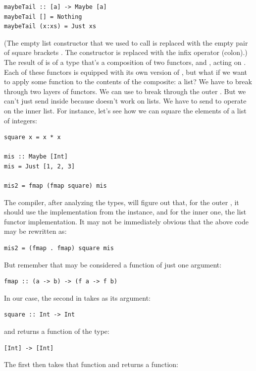 \begin{verbatim}
maybeTail :: [a] -> Maybe [a]
maybeTail [] = Nothing
maybeTail (x:xs) = Just xs
\end{verbatim}
(The empty list constructor that we used to call  is
replaced with the empty pair of square brackets \code{{[}{]}}. The
 constructor is replaced with the infix operator \code{:}
(colon).) The result of  is of a type that's a
composition of two functors,  and \code{{[}{]}}, acting
on . Each of these functors is equipped with its own version
of , but what if we want to apply some function 
to the contents of the composite: a  list? We have to
break through two layers of functors. We can use  to break
through the outer . But we can't just send 
inside  because  doesn't work on lists. We have
to send  to operate on the inner list. For instance,
let's see how we can square the elements of a  list of
integers:

\begin{verbatim}
square x = x * x

mis :: Maybe [Int]
mis = Just [1, 2, 3]

mis2 = fmap (fmap square) mis
\end{verbatim}
The compiler, after analyzing the types, will figure out that, for the
outer , it should use the implementation from the
 instance, and for the inner one, the list functor
implementation. It may not be immediately obvious that the above code
may be rewritten as:

\begin{verbatim}
mis2 = (fmap . fmap) square mis
\end{verbatim}
But remember that  may be considered a function of just one
argument:

\begin{verbatim}
fmap :: (a -> b) -> (f a -> f b)
\end{verbatim}
In our case, the second  in  takes
as its argument:

\begin{verbatim}
square :: Int -> Int
\end{verbatim}
and returns a function of the type:

\begin{verbatim}
[Int] -> [Int]
\end{verbatim}
The first  then takes that function and returns a function:

